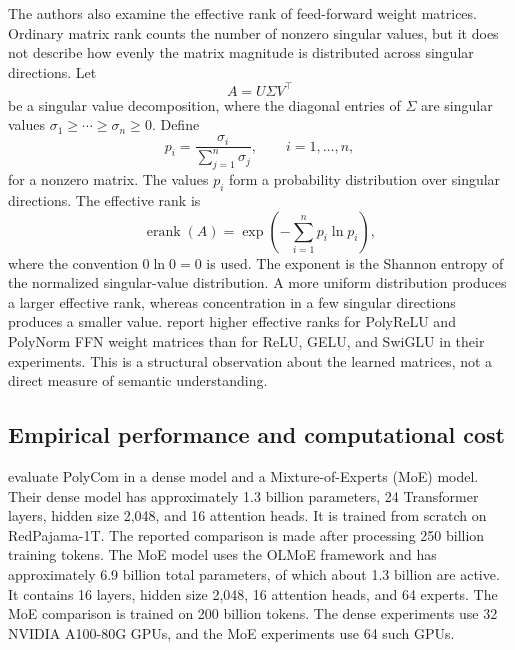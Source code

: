 The authors also examine the effective rank of feed-forward weight
matrices. Ordinary matrix rank counts the number of nonzero singular
values, but it does not describe how evenly the matrix magnitude is
distributed across singular directions. Let
\begin{equation}
    A=U\Sigma V^{\top}
    \label{eq:act-svd}
\end{equation}
be a singular value decomposition, where the diagonal entries of
\(\Sigma\) are singular values
\(\sigma_1\geq\cdots\geq\sigma_n\geq0\). Define
\begin{equation}
    p_i
    =
    \frac{\sigma_i}{\sum_{j=1}^{n}\sigma_j},
    \qquad i=1,\ldots,n,
    \label{eq:act-singular-probabilities}
\end{equation}
for a nonzero matrix. The values \(p_i\) form a probability
distribution over singular directions. The effective rank is
\begin{equation}
    \operatorname{erank}(A)
    =
    \exp\left(
        -\sum_{i=1}^{n}p_i\ln p_i
    \right),
    \label{eq:act-effective-rank}
\end{equation}
where the convention \(0\ln0=0\) is used. The exponent is the
Shannon entropy of the normalized singular-value distribution.
A more uniform distribution produces a larger effective rank,
whereas concentration in a few singular directions produces a
smaller value. \textcite{zhuo2025polycom} report higher effective
ranks for PolyReLU and PolyNorm FFN weight matrices than for
ReLU, GELU, and SwiGLU in their experiments. This is a structural
observation about the learned matrices, not a direct measure of
semantic understanding.

\subsection{Empirical performance and computational cost}
\label{subsec:act-experiments}

\textcite{zhuo2025polycom} evaluate PolyCom in a dense model and
a Mixture-of-Experts (MoE) model. Their dense model has approximately
1.3 billion parameters, 24 Transformer layers, hidden size 2,048,
and 16 attention heads. It is trained from scratch on RedPajama-1T.
The reported comparison is made after processing 250 billion
training tokens. The MoE model uses the OLMoE framework and has
approximately 6.9 billion total parameters, of which about 1.3
billion are active. It contains 16 layers, hidden size 2,048,
16 attention heads, and 64 experts. The MoE comparison is trained
on 200 billion tokens. The dense experiments use 32 NVIDIA
A100-80G GPUs, and the MoE experiments use 64 such GPUs.

